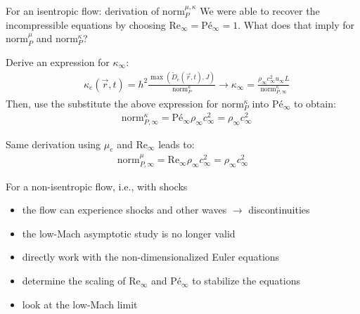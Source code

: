 \documentclass[xcolor=dvipsnames,10pt]{beamer}
\renewcommand{\Re}{\textrm{Re}}
\newcommand{\Pe}{\textrm{P\'e}}
\newcommand{\norm}{\textrm{norm}}
\begin{document}
\begin{frame}{For an isentropic flow: derivation of $\norm_P^{\mu, \kappa}$ }
We were able to recover the incompressible equations by choosing $\Re_\infty = \Pe_\infty = 1$. What does that imply for $\norm_P^\mu$ and $\norm_P^\kappa$?
\begin{block}{}
Derive an expression for $\kappa_\infty$:
\begin{align}
&\kappa_e(\vec{r},t) = h^2 \frac{\max \left( \tilde{D}_e(\vec{r},t), J \right)}{\norm_P^\kappa} \longrightarrow \kappa_\infty = \frac{ \rho_\infty c_\infty^2 u_\infty L }{ \norm_{P,\infty}^\kappa } \nonumber 
\end{align}
Then, use the substitute the above expression for $\norm_P^\kappa$ into $\Pe_\infty$ to obtain:
\begin{align}
&\norm_{P,\infty}^{\kappa} = \Pe_\infty \rho_\infty c_\infty^2 = \rho_\infty c_\infty^2 \nonumber
\end{align}
\end{block}
\begin{block}{}
Same derivation using $\mu_e$ and $\Re_\infty$ leads to:
\begin{align}
\norm_{P,\infty}^{\mu} = \Re_\infty \rho_\infty c_\infty^2 = \rho_\infty c_\infty^2 \nonumber
\end{align}
\end{block}
\end{frame}
\begin{frame}{For a non-isentropic flow, i.e., with shocks}
\begin{block}{}
\begin{itemize}
\setlength{\itemsep}{10pt}
\item the flow can experience shocks and other waves $\to$ discontinuities
\item the low-Mach asymptotic study is no longer valid
\item directly work with the non-dimensionalized Euler equations
\item determine the scaling of $\Re_\infty$ and $\Pe_\infty$ to stabilize the equations
\item look at the low-Mach limit
\end{itemize}
\end{block}
\end{frame}
\end{document}
